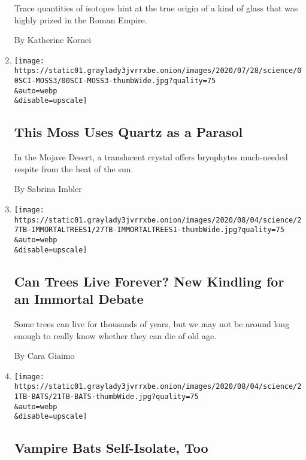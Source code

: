 \begin{enumerate}
  Trace quantities of isotopes hint at the true origin of a kind of
  glass that was highly prized in the Roman Empire.

  By Katherine Kornei
\item
  \href{/2020/07/29/science/moss-quartz-biology-syntrichia.html}{}

  \texttt{[image: https://static01.graylady3jvrrxbe.onion/images/2020/07/28/science/00SCI-MOSS3/00SCI-MOSS3-thumbWide.jpg?quality=75\\\&auto=webp\\\&disable=upscale]}

  \hypertarget{this-moss-uses-quartz-as-a-parasol}{%
  \subsection{This Moss Uses Quartz as a
  Parasol}\label{this-moss-uses-quartz-as-a-parasol}}

  In the Mojave Desert, a translucent crystal offers bryophytes
  much-needed respite from the heat of the sun.

  By Sabrina Imbler
\item
  \href{/2020/07/27/science/trees-immortality.html}{}

  \texttt{[image: https://static01.graylady3jvrrxbe.onion/images/2020/08/04/science/27TB-IMMORTALTREES1/27TB-IMMORTALTREES1-thumbWide.jpg?quality=75\\\&auto=webp\\\&disable=upscale]}

  \hypertarget{can-trees-live-forever-new-kindling-for-an-immortal-debate}{%
  \subsection{Can Trees Live Forever? New Kindling for an Immortal
  Debate}\label{can-trees-live-forever-new-kindling-for-an-immortal-debate}}

  Some trees can live for thousands of years, but we may not be around
  long enough to really know whether they can die of old age.

  By Cara Giaimo
\item
  \href{/2020/07/22/science/vampire-bats-viruses.html}{}

  \texttt{[image: https://static01.graylady3jvrrxbe.onion/images/2020/08/04/science/21TB-BATS/21TB-BATS-thumbWide.jpg?quality=75\\\&auto=webp\\\&disable=upscale]}

  \hypertarget{vampire-bats-self-isolate-too}{%
  \subsection{Vampire Bats Self-Isolate,
  Too}\label{vampire-bats-self-isolate-too}}


\end{enumerate}
